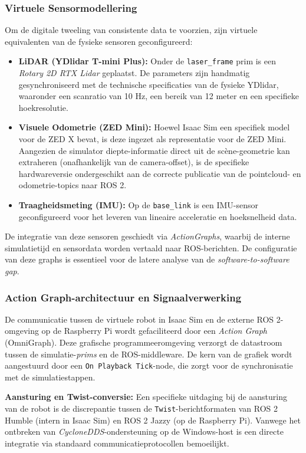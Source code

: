 \subsubsection{Virtuele Sensormodellering}
Om de digitale tweeling van consistente data te voorzien, zijn virtuele equivalenten van de fysieke sensoren geconfigureerd:
\begin{itemize}
\item \textbf{LiDAR (YDlidar T-mini Plus):} Onder de \texttt{laser\_frame} prim is een \textit{Rotary 2D RTX Lidar} geplaatst. De parameters zijn handmatig gesynchroniseerd met de technische specificaties van de fysieke YDlidar, waaronder een scanratio van 10 Hz, een bereik van 12 meter en een specifieke hoekresolutie.
\item \textbf{Visuele Odometrie (ZED Mini):} Hoewel Isaac Sim een specifiek model voor de ZED X bevat, is deze ingezet als representatie voor de ZED Mini. Aangezien de simulator diepte-informatie direct uit de scène-geometrie kan extraheren (onafhankelijk van de camera-offset), is de specifieke hardwareversie ondergeschikt aan de correcte publicatie van de pointcloud- en odometrie-topics naar ROS 2.
\item \textbf{Traagheidsmeting (IMU):} Op de \texttt{base\_link} is een IMU-sensor geconfigureerd voor het leveren van lineaire acceleratie en hoeksnelheid data.
\end{itemize}

De integratie van deze sensoren geschiedt via \textit{ActionGraphs}, waarbij de interne simulatietijd en sensordata worden vertaald naar ROS-berichten. De configuratie van deze graphs is essentieel voor de latere analyse van de \textit{software-to-software gap}.

\subsubsection{Action Graph-architectuur en Signaalverwerking}
\label{subsubsec:action_graph}

De communicatie tussen de virtuele robot in Isaac Sim en de externe ROS 2-omgeving op de Raspberry Pi wordt gefaciliteerd door een \textit{Action Graph} (OmniGraph). Deze grafische programmeeromgeving verzorgt de datastroom tussen de simulatie-\textit{prims} en de ROS-middleware. De kern van de grafiek wordt aangestuurd door een \texttt{On Playback Tick}-node, die zorgt voor de synchronisatie met de simulatiestappen.

\textbf{Aansturing en Twist-conversie:}
Een specifieke uitdaging bij de aansturing van de robot is de discrepantie tussen de \texttt{Twist}-berichtformaten van ROS 2 Humble (intern in Isaac Sim) en ROS 2 Jazzy (op de Raspberry Pi). Vanwege het ontbreken van \textit{CycloneDDS}-ondersteuning op de Windows-host is een directe integratie via standaard communicatieprotocollen bemoeilijkt. 


